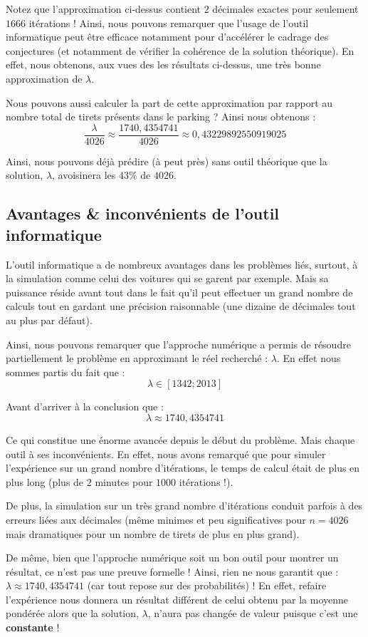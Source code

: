 \documentclass[a4paper,francais,11pt]{article}
\begin{document}
Notez que l'approximation ci-dessus contient $2$ décimales exactes pour seulement $1666$ itérations ! Ainsi, nous pouvons remarquer que l'usage de l'outil informatique peut être efficace notamment pour d'accélérer le cadrage des conjectures (et notamment de vérifier la cohérence de la solution théorique). En effet, nous obtenons, aux vues des les résultats ci-dessus, une très bonne approximation de $\lambda$.

Nous pouvons aussi calculer la part de cette approximation par rapport au nombre total de tirets présents dans le parking ? Ainsi nous obtenons :
\[\frac{\lambda}{4026}\approx\frac{1740{,}4354741}{4026}\approx0{,}43229892550919025\]

Ainsi, nous pouvons déjà prédire (à peut près) sans outil théorique que la solution, $\lambda$, avoisinera les $43\%$ de $4026$.
\subsection{Avantages \& inconvénients de l'outil informatique}
L'outil informatique a de nombreux avantages dans les problèmes liés, surtout, à la simulation comme celui des voitures qui se garent par exemple. Mais sa puissance réside avant tout dans le fait qu'il peut effectuer un grand nombre de calculs tout en gardant une précision raisonnable (une dizaine de décimales tout au plus par défaut).

Ainsi, nous pouvons remarquer que l'approche numérique a permis de résoudre partiellement le problème en approximant le réel recherché : $\lambda$. En effet nous sommes partis du fait que :
\[\lambda\in\left[1342;2013\right]\]

Avant d'arriver à la conclusion que :
\[\lambda\approx1740{,}4354741\]

Ce qui constitue une énorme avancée depuis le début du problème. Mais chaque outil à ses inconvénients. En effet, nous avons remarqué que pour simuler l'expérience sur un grand nombre d'itérations, le temps de calcul était de plus en plus long (plus de $2$ minutes pour $1000$ itérations !). 

De plus, la simulation sur un très grand nombre d'itérations conduit parfois à des erreurs liées aux décimales (même minimes et peu significatives pour $n=4026$ mais dramatiques pour un nombre de tirets de plus en plus grand). 

De même, bien que l'approche numérique soit un bon outil pour montrer un résultat, ce n'est pas une preuve formelle ! Ainsi, rien ne nous garantit que : $\lambda\approx1740{,}4354741$ (car tout repose sur des probabilités) ! En effet, refaire l'expérience nous donnera un résultat différent de celui obtenu par la moyenne pondérée alors que la solution, $\lambda$, n'aura pas changée de valeur puisque c'est une \textbf{constante} !
\end{document}
